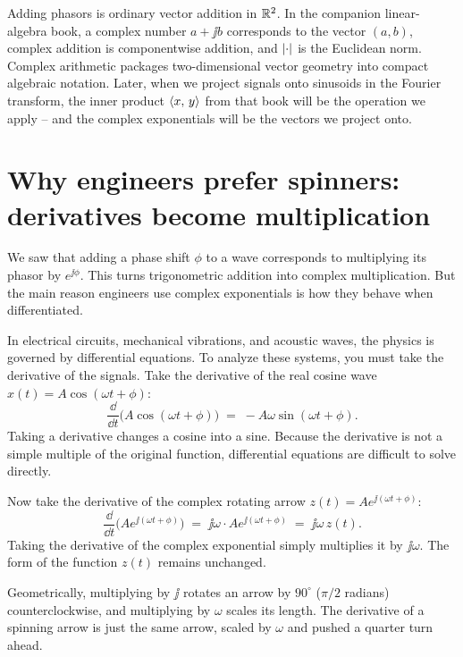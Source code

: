 \begin{connectionbox}
Adding phasors is ordinary vector addition in $\mathbb{R}^2$. In the companion linear-algebra book, a
complex number $a + \jj b$ corresponds to the vector $(a,b)$, complex addition is componentwise
addition, and $\lvert\cdot\rvert$ is the Euclidean norm. Complex arithmetic packages
two-dimensional vector geometry into compact algebraic notation. Later, when we project signals
onto sinusoids in the Fourier transform, the inner product $\langle x,\, y \rangle$ from that book will be
the operation we apply -- and the complex exponentials will be the vectors we project onto.
\end{connectionbox}


\section{Why engineers prefer spinners: derivatives become multiplication}
\label{ch04:derivatives}

We saw that adding a phase shift $\phi$ to a wave corresponds to multiplying its phasor by $e^{\jj\phi}$. This turns trigonometric addition into complex multiplication. But the main reason engineers use complex exponentials is how they behave when differentiated.

In electrical circuits, mechanical vibrations, and acoustic waves, the physics is governed by differential equations. To analyze these systems, you must take the derivative of the signals. Take the derivative of the real cosine wave $x(t) = A\cos(\omega t + \phi)$:
\[
  \frac{\dd}{\dd t} \big( A\cos(\omega t + \phi) \big) \;=\; -A\omega\sin(\omega t + \phi).
\]
Taking a derivative changes a cosine into a sine. Because the derivative is not a simple multiple of the original function, differential equations are difficult to solve directly.

Now take the derivative of the complex rotating arrow $z(t) = A e^{\jj(\omega t + \phi)}$:
\[
  \frac{\dd}{\dd t} \big( A e^{\jj(\omega t + \phi)} \big) \;=\; \jj\omega \cdot A e^{\jj(\omega t + \phi)} \;=\; \jj\omega \, z(t).
\]
Taking the derivative of the complex exponential simply multiplies it by $\jj\omega$. The form of the function $z(t)$ remains unchanged.

Geometrically, multiplying by $\jj$ rotates an arrow by $90^\circ$ ($\pi/2$ radians) counterclockwise, and multiplying by $\omega$ scales its length. The derivative of a spinning arrow is just the same arrow, scaled by $\omega$ and pushed a quarter turn ahead. 

